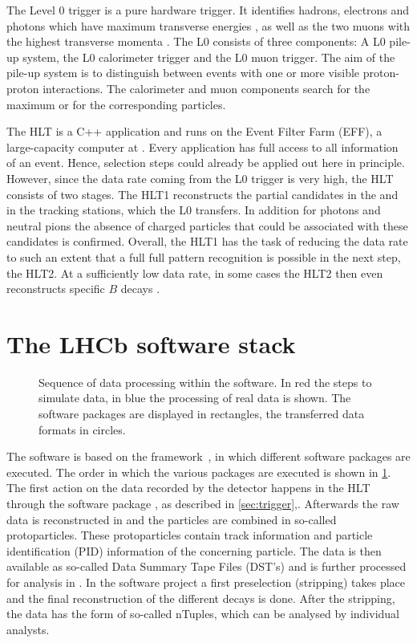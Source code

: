 The Level 0 trigger is a pure hardware trigger.
It identifies hadrons, electrons and photons which have maximum transverse energies \et, as well as the two muons with the highest transverse momenta \pt.
The L0 consists of three components: A L0 pile-up system, the L0 calorimeter trigger and the L0 muon trigger.
The aim of the pile-up system is to distinguish between events with one or more visible proton-proton interactions.
The calorimeter and muon components search for the maximum \et or \pt for the corresponding particles.

The HLT is a C++ application and runs on the Event Filter Farm (EFF), a large-capacity computer at \cern.
Every application has full access to all information of an event.
Hence, selection steps could already be applied out here in principle.
However, since the data rate coming from the L0 trigger is very high, the HLT consists of two stages.
The HLT1 reconstructs the partial candidates in the \velo and in the tracking stations, which the L0 transfers.
In addition for photons and neutral pions the absence of charged particles that could be associated with these candidates is confirmed.
Overall, the HLT1 has the task of reducing the data rate to such an extent that a full full pattern recognition is possible in the next step, the HLT2.
At a sufficiently low data rate, in some cases the HLT2 then even reconstructs specific $B$ decays .

\section{The LHCb software stack}

\begin{figure}[tbp]
    \centering
    
    \caption{Sequence of data processing within the \lhcb software.
    In red the steps to simulate data, in blue the processing of real data is shown.
    The software packages are displayed in rectangles, the transferred data formats in circles.}
    \label{fig:lhcbsoftware}
\end{figure}
The \lhcb software is based on the \gaudi framework~\cite{Barrand:2001ny}, in which different software packages are executed.
The order in which the various packages are executed is shown in \cref{fig:lhcbsoftware}.
The first action on the data recorded by the detector happens in the HLT through the software package \moore \cite{Aaij:2012me, Albrecht:2013fba}, as described in \cref{sec:trigger},.
Afterwards the raw data is reconstructed in \brunel \cite{Szumlak:2007zz, VanderEijk:2001wqa, Kucharczyk:1756296} and the particles are combined in so-called protoparticles.
These protoparticles contain track information and particle identification (PID) information of the concerning particle.
The data is then available as so-called Data Summary Tape Files (DST's) and is further processed for analysis in \davinci.
In the \davinci software project a first preselection (stripping) takes place and the final reconstruction of the different decays is done.
After the stripping, the data has the form of so-called nTuples, which can be analysed by individual analysts.


